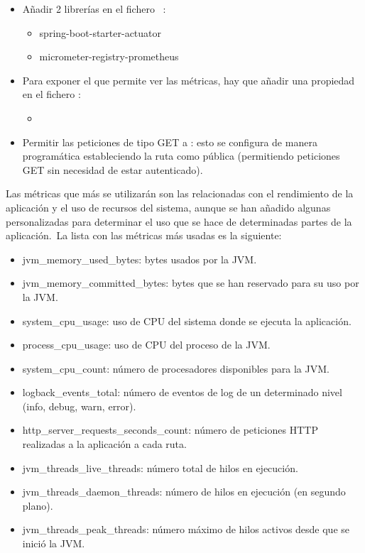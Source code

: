 \begin{itemize}
	\item Añadir 2 librerías en el fichero ~\cite{prometheus-metrics-pom}:
	\begin{itemize}
		\item spring-boot-starter-actuator
		\item micrometer-registry-prometheus
	\end{itemize}

	\item Para exponer el  que permite ver las métricas, hay que añadir una propiedad en el fichero
	:
	\begin{itemize}
		\item {}
	\end{itemize}

	\item Permitir las peticiones de tipo GET a : esto se configura
	de manera programática estableciendo la ruta como pública (permitiendo peticiones GET sin necesidad de estar
	autenticado).
\end{itemize}
\label{itm:metrics-export-config}

Las métricas que más se utilizarán son las relacionadas con el rendimiento de la aplicación y el uso de recursos del
sistema, aunque se han añadido algunas personalizadas para determinar el uso que se hace de determinadas partes de la
aplicación.\ La lista con las métricas más usadas es la siguiente:

\begin{itemize}
	\item jvm\_memory\_used\_bytes: bytes usados por la JVM\@.
	\item jvm\_memory\_committed\_bytes: bytes que se han reservado para su uso por la JVM\@.
	\item system\_cpu\_usage: uso de CPU del sistema donde se ejecuta la aplicación.
	\item process\_cpu\_usage: uso de CPU del proceso de la JVM\@.
	\item system\_cpu\_count: número de procesadores disponibles para la JVM\@.
	\item logback\_events\_total: número de eventos de log de un determinado nivel (info, debug, warn, error).
	\item http\_server\_requests\_seconds\_count: número de peticiones HTTP realizadas a la aplicación a cada ruta.
	\item jvm\_threads\_live\_threads: número total de hilos en ejecución.
	\item jvm\_threads\_daemon\_threads: número de hilos en ejecución (en segundo plano).
	\item jvm\_threads\_peak\_threads: número máximo de hilos activos desde que se inició la JVM\@.
\end{itemize}
\label{itm:most-used-metrics}

